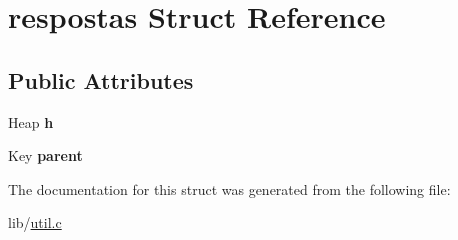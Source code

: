 \hypertarget{structrespostas}{}\section{respostas Struct Reference}
\label{structrespostas}
\subsection*{Public Attributes}
\begin{DoxyCompactItemize}
\item 
Heap {\bfseries h}\hypertarget{structrespostas_a411daf16e680c3496d06d56dbee2d3f2}{}\label{structrespostas_a411daf16e680c3496d06d56dbee2d3f2}

\item 
Key {\bfseries parent}\hypertarget{structrespostas_a76deaaf9dd08fc499d385f8570e171a5}{}\label{structrespostas_a76deaaf9dd08fc499d385f8570e171a5}

\end{DoxyCompactItemize}


The documentation for this struct was generated from the following file\+:\begin{DoxyCompactItemize}
\item 
lib/\hyperlink{util_8c}{util.\+c}\end{DoxyCompactItemize}
